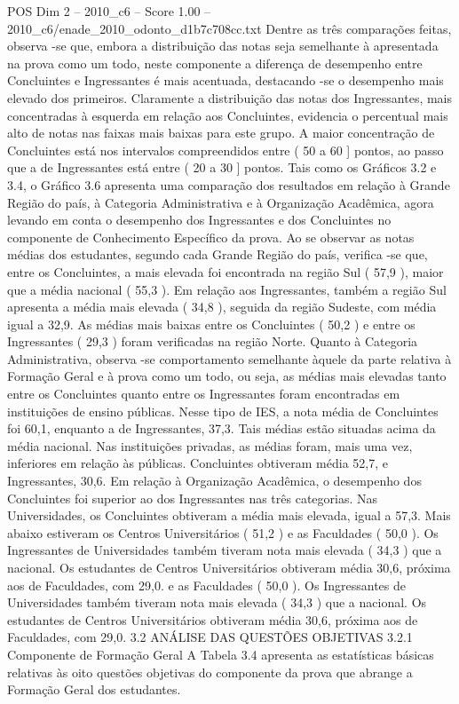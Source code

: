 \begin{textsample}{POS Dim 2 – 2010\_c6 – Score 1.00 – 2010\_c6/enade\_2010\_odonto\_d1b7c708cc.txt}
Dentre as três comparações feitas, observa -se que, embora a distribuição das notas seja semelhante à apresentada na prova como um todo, neste componente a diferença de desempenho entre Concluintes e Ingressantes é mais acentuada, destacando -se o desempenho mais elevado dos primeiros.
Claramente a distribuição das notas dos Ingressantes, mais concentradas à esquerda em relação aos Concluintes, evidencia o percentual mais alto de notas nas faixas mais baixas para este grupo.
A maior concentração de Concluintes está nos intervalos compreendidos entre ( 50 a 60 ] pontos, ao passo que a de Ingressantes está entre ( 20 a 30 ] pontos.
Tais como os Gráficos 3.2 e 3.4, o Gráfico 3.6 apresenta uma comparação dos resultados em relação à Grande Região do país, à Categoria Administrativa e à Organização Acadêmica, agora levando em conta o desempenho dos Ingressantes e dos Concluintes no componente de Conhecimento Específico da prova.
Ao se observar as notas médias dos estudantes, segundo cada Grande Região do país, verifica -se que, entre os Concluintes, a mais elevada foi encontrada na região Sul ( 57,9 ), maior que a média nacional ( 55,3 ).
Em relação aos Ingressantes, também a região Sul apresenta a média mais elevada ( 34,8 ), seguida da região Sudeste, com média igual a 32,9.
As médias mais baixas entre os Concluintes ( 50,2 ) e entre os Ingressantes ( 29,3 ) foram verificadas na região Norte.
Quanto à Categoria Administrativa, observa -se comportamento semelhante àquele da parte relativa à Formação Geral e à prova como um todo, ou seja, as médias mais elevadas tanto entre os Concluintes quanto entre os Ingressantes foram encontradas em instituições de ensino públicas.
Nesse tipo de IES, a nota média de Concluintes foi 60,1, enquanto a de Ingressantes, 37,3.
Tais médias estão situadas acima da média nacional.
Nas instituições privadas, as médias foram, mais uma vez, inferiores em relação às públicas.
Concluintes obtiveram média 52,7, e Ingressantes, 30,6.
Em relação à Organização Acadêmica, o desempenho dos Concluintes foi superior ao dos Ingressantes nas três categorias.
Nas Universidades, os Concluintes obtiveram a média mais elevada, igual a 57,3.
Mais abaixo estiveram os Centros Universitários ( 51,2 ) e as Faculdades ( 50,0 ).
Os Ingressantes de Universidades também tiveram nota mais elevada ( 34,3 ) que a nacional.
Os estudantes de Centros Universitários obtiveram média 30,6, próxima aos de Faculdades, com 29,0. e as Faculdades ( 50,0 ).
Os Ingressantes de Universidades também tiveram nota mais elevada ( 34,3 ) que a nacional.
Os estudantes de Centros Universitários obtiveram média 30,6, próxima aos de Faculdades, com 29,0. 3.2 ANÁLISE DAS QUESTÕES OBJETIVAS 3.2.1 Componente de Formação Geral A Tabela 3.4 apresenta as estatísticas básicas relativas às oito questões objetivas do componente da prova que abrange a Formação Geral dos estudantes.

\end{textsample}
